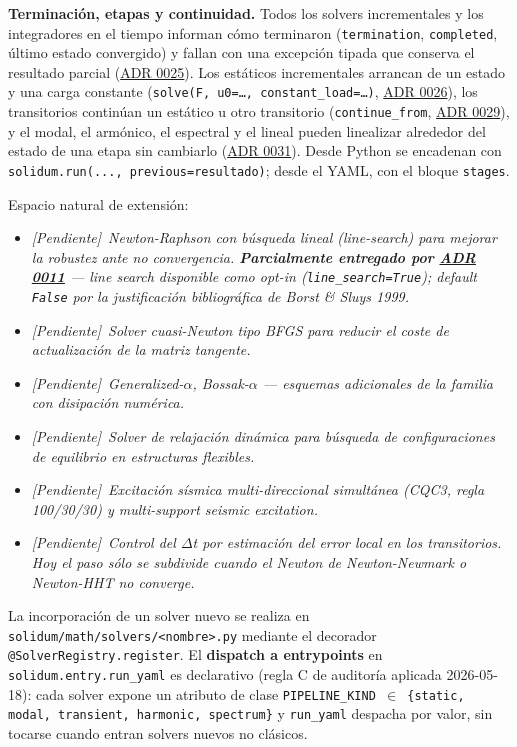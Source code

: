 \documentclass[11pt,oneside]{report}
\newcommand{\pendiente}[1]{\textcolor{pendienteorange}{\textit{[Pendiente]}~\textcolor{pendienteorange}{\textit{#1}}}}
\begin{document}
\textbf{Terminación, etapas y continuidad.} Todos los solvers incrementales y los integradores en el tiempo informan cómo terminaron (\texttt{termination}, \texttt{completed}, último estado convergido) y fallan con una excepción tipada que conserva el resultado parcial (\hyperref[adr:0025]{ADR 0025}). Los estáticos incrementales arrancan de un estado y una carga constante (\texttt{solve(F, u0=\ldots{}, constant\_\allowbreak{}load=\ldots{})}, \hyperref[adr:0026]{ADR 0026}), los transitorios continúan un estático u otro transitorio (\texttt{continue\_from}, \hyperref[adr:0029]{ADR 0029}), y el modal, el armónico, el espectral y el lineal pueden linealizar alrededor del estado de una etapa sin cambiarlo (\hyperref[adr:0031]{ADR 0031}). Desde Python se encadenan con \texttt{solidum.\allowbreak{}run(.\allowbreak{}.\allowbreak{}.\allowbreak{}, previous=resultado)}; desde el YAML, con el bloque \texttt{stages}.

Espacio natural de extensión:

\begin{itemize}
  \item \pendiente{Newton-Raphson con búsqueda lineal (line-search) para mejorar la robustez ante no convergencia. \textbf{Parcialmente entregado por \hyperref[adr:0011]{ADR 0011}} --- line search disponible como opt-in (\texttt{line\_search=True}); default \texttt{False} por la justificación bibliográfica de Borst \& Sluys 1999.}
  \item \pendiente{Solver cuasi-Newton tipo BFGS para reducir el coste de actualización de la matriz tangente.}
  \item \pendiente{Generalized-\ensuremath{\alpha}, Bossak-\ensuremath{\alpha} --- esquemas adicionales de la familia con disipación numérica.}
  \item \pendiente{Solver de relajación dinámica para búsqueda de configuraciones de equilibrio en estructuras flexibles.}
  \item \pendiente{Excitación sísmica multi-direccional simultánea (CQC3, regla 100/30/30) y multi-support seismic excitation.}
  \item \pendiente{Control del \ensuremath{\Delta}t por estimación del error local en los transitorios. Hoy el paso sólo se subdivide cuando el Newton de Newton-Newmark o Newton-HHT no converge.}
\end{itemize}

La incorporación de un solver nuevo se realiza en \texttt{solidum/\allowbreak{}math/\allowbreak{}solvers/\allowbreak{}\textless{}nombre\textgreater{}.\allowbreak{}py} mediante el decorador \texttt{@SolverRegistry.\allowbreak{}register}. El \textbf{dispatch a entrypoints} en \texttt{solidum.\allowbreak{}entry.\allowbreak{}run\_\allowbreak{}yaml} es declarativo (regla C de auditoría aplicada 2026-05-18): cada solver expone un atributo de clase \texttt{PIPELINE\_\allowbreak{}KIND \ensuremath{\in} \{\textquotedbl{}static\textquotedbl{}, \textquotedbl{}modal\textquotedbl{}, \textquotedbl{}transient\textquotedbl{}, \textquotedbl{}harmonic\textquotedbl{}, \textquotedbl{}spectrum\textquotedbl{}\}} y \texttt{run\_yaml} despacha por valor, sin tocarse cuando entran solvers nuevos no clásicos.
\end{document}

